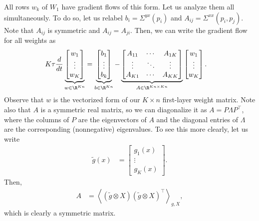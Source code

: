 \documentclass{article}
\begin{document}
All rows $w_k$ of $W_1$ have gradient flows of this form.
Let us analyze them all simultaneously.
To do so, let us relabel $b_i = \Sigma^{yx}(p_i)$ and $A_{ij} = \Sigma^{xx}(p_i,p_j)$.
Note that $A_{ij}$ is symmetric and $A_{ij} = A_{ji}$.
Then, we can write the gradient flow for all weights as
\begin{align}
  K \tau \frac{d}{dt} \underbrace{\begin{bmatrix} w_1 \\ \vdots \\ w_K \end{bmatrix}}_{w \in \R^{Kn}}
  &= \underbrace{\begin{bmatrix} b_1 \\ \vdots \\ b_k \end{bmatrix}}_{b \in \R^{Kn}} - \underbrace{\begin{bmatrix} A_{11} & \cdots & A_{1K} \\ \vdots & \ddots & \vdots \\ A_{K1} & \cdots & A_{KK} \end{bmatrix}}_{A \in \R^{Kn \times Kn}} \begin{bmatrix} w_1 \\ \vdots \\ w_K \end{bmatrix}. \label{eq:grad_flow_matrix}
\end{align}
Observe that $w$ is the vectorized form of our $K \times n$ first-layer weight matrix.
Note also that $A$ is a symmetric real matrix, so we can diagonalize it as $A = P \Lambda P^\top$, where the columns of $P$ are the eigenvectors of $A$ and the diagonal entries of $\Lambda$ are the corresponding (nonnegative) eigenvalues.
To see this more clearly, let us write
\begin{align}
  \tilde{g}(x) &= \begin{bmatrix} g_1(x) \\ \vdots \\ g_K(x) \end{bmatrix}. %
\end{align}
Then,
\begin{align}
  A &= \left\langle (\tilde{g} \otimes X) (\tilde{g} \otimes X)^\top \right\rangle_{g,X}, \label{eq:A_kron}
\end{align}
which is clearly a symmetric matrix.
\end{document}
